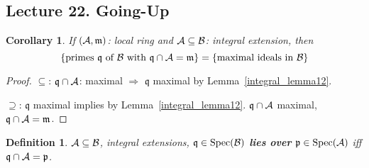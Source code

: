\documentclass[11pt]{article}
\newtheorem{cor}[thm]{Corollary}
\newtheorem{dfn}[thm]{Definition}
\newcommand{\scm}{{\mathfrak m}}
\newcommand{\scp}{{\mathfrak p}}
\newcommand{\scq}{\mathfrak q}
\newcommand{\cala}{{\cal A}}
\newcommand{\calb}{{\cal B}}
\newcommand{\Lrta}{\Longrightarrow}
\begin{document}
\subsection{Lecture 22. Going-Up}
\begin{cor}
If $(\cala,\scm)$: local ring and $\cala\subseteq \calb$: integral extension, then 
$$
\{\text{primes $\scq$ of $\calb$ with $\scq\cap\cala=\scm$}\}=\{\text{maximal ideals in $\calb$}\}
$$
\end{cor}
\begin{proof}
$\subseteq$: $\scq\cap \cala$: maximal $\Lrta$ $\scq$ maximal by Lemma~\ref{integral_lemma12}.

$\supseteq$: $\scq$ maximal implies by Lemma~\ref{integral_lemma12}. $\scq\cap \cala$ maximal, $\scq\cap\cala=\scm$.
\end{proof}
\begin{dfn}
$\cala\subseteq \calb$, integral extensions, $\scq\in \text{Spec}(\calb)$ \textbf{lies over} $\scp\in \text{Spec}(\cala)$ iff $\scq\cap\cala=\scp$.
\end{dfn}
\end{document}
